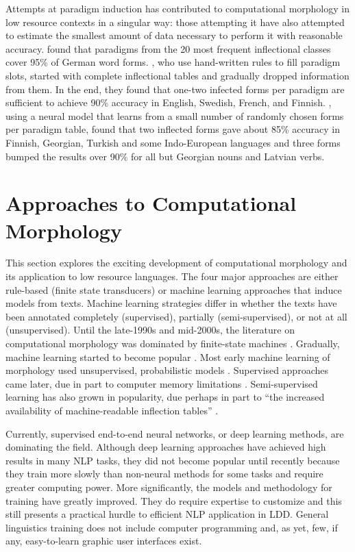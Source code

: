 \documentclass[12pt]{article}
\newcommand{\note}[4][]{\todo[author=#2,color=#3,size=\scriptsize,fancyline,caption={},#1]{#4}}
\newcommand{\mans}[2][]{\note[#1]{MH}{blue!40}{#2}{}}
\begin{document}
Attempts at paradigm induction has contributed to computational morphology in low resource  contexts in a singular way: those attempting it have also attempted to estimate the smallest amount of data necessary to perform it with reasonable accuracy.  found that paradigms from the 20 most frequent inflectional classes cover 95\% of German word forms. , who use hand-written rules to fill paradigm slots, started with complete inflectional tables and gradually dropped information from them. In the end, they found that one-two infected forms per paradigm are sufficient to achieve 90\% accuracy in English, Swedish, French, and Finnish. , using a neural model that learns from a small number of randomly chosen forms per paradigm table, found that two inflected forms gave about 85\% accuracy in Finnish, Georgian, Turkish and some Indo-European languages and three forms bumped the results over 90\% for all but Georgian nouns and Latvian verbs.

\section{Approaches to Computational Morphology}
\label{compMorph}

This section explores the exciting development of computational morphology and its application to low resource languages. The four major approaches are either  rule-based (finite state transducers) or machine learning approaches that induce models from texts. Machine learning strategies differ in whether the texts have been annotated completely (supervised), partially (semi-supervised), or not at all (unsupervised). Until the late-1990s and mid-2000s, the literature on computational morphology was dominated by finite-state machines \cite{kaplan_phonological_1981,koskenniemi_two-level_1983,beesley_finite-state_2003}. Gradually, machine learning started to become popular \cite{cohen_joint_2007,ruokolainen_comparative_2016}. Most early machine learning of morphology used unsupervised, probabilistic models \cite{roark_computational_2007}. Supervised approaches came later, due in part to computer memory limitations \cite{hammarstrom_unsupervised_2011}. Semi-supervised learning has also grown in popularity, due perhaps in part to ``the increased availability of machine-readable inflection tables'' \cite[page 18]{goldsmith_computational_2017}. 

Currently, supervised end-to-end neural networks, or deep learning methods, are dominating the field. Although deep learning approaches have achieved high results in many NLP tasks, they did not become popular until recently because they train more slowly than non-neural methods for some tasks \cite{cotterell_cross-lingual_2017} and require greater computing power.\mans{Also, seq2seq is a recent development\ldots} More significantly, the models and methodology for training have greatly improved. They do require expertise to customize and this still presents a practical hurdle to efficient NLP application in LDD. General linguistics training does not include computer programming and, as yet, few, if any, easy-to-learn graphic user interfaces exist. 
\end{document}
